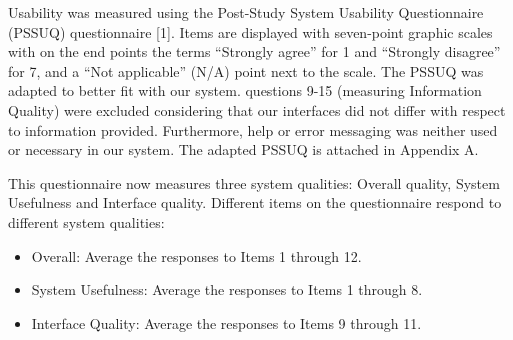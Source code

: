 Usability was measured using the Post-Study System Usability Questionnaire (PSSUQ) questionnaire [1]. Items are displayed with seven-point graphic scales with on the end points the terms “Strongly agree” for 1 and “Strongly disagree” for 7, and a “Not applicable” (N/A) point next to the scale. The PSSUQ was adapted to better fit with our system. questions 9-15 (measuring Information Quality) were excluded considering that our interfaces did not differ with respect to information provided. Furthermore, help or error messaging was neither used or necessary in our system. The adapted PSSUQ is attached in Appendix A. 

This questionnaire now measures three system qualities: Overall quality, System Usefulness and Interface quality.  Different items on the questionnaire respond to different system qualities:
\begin{itemize}
	\item Overall: Average the responses to Items 1 through 12.
	\item System Usefulness: Average the responses to Items 1 through 8.
    \item Interface Quality: Average the responses to Items 9 through 11.
\end{itemize}
\newline


